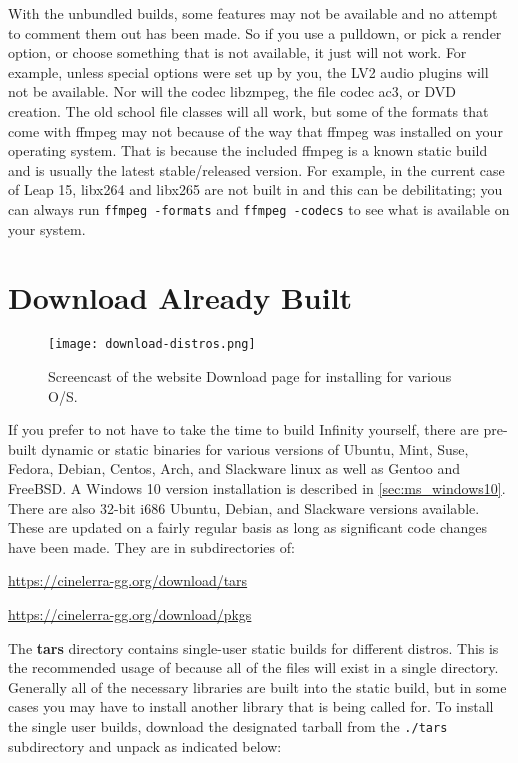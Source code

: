 With the unbundled builds, some features may not be available and
no attempt to comment them out has been made.  So if you use a
pulldown, or pick a render option, or choose something that is not
available, it just will not work.  For example, unless special
options were set up by you, the LV2 audio plugins will not be
available.  Nor will the codec libzmpeg, the file codec ac3, or
DVD creation.  The old school file classes will all work, but some
of the formats that come with ffmpeg may not because of the way
that ffmpeg was installed on your operating system.  That is
because the \CGG{} included ffmpeg is a known static build and is
usually the latest stable/released version.  For example, in the
current case of Leap 15, libx264 and libx265 are not built in and
this can be debilitating; you can always run \texttt{ffmpeg
  -formats} and \texttt{ffmpeg -codecs} to see what is available
on your system.


\section{Download Already Built \CGG{}}%
\label{sec:download_already_built_cinelerra_gg}

\begin{figure}[htpb]
  \centering
  \texttt{[image: download-distros.png]}
  \caption{Screencast of the website Download page for installing \CGG{} for various O/S.}
  \label{fig:download-distros}
\end{figure}

If you prefer to not have to take the time to build \CGG{} Infinity
yourself, there are pre-built dynamic or static binaries for various
versions of Ubuntu, Mint, Suse, Fedora, Debian, Centos, Arch, and
Slackware linux as well as Gentoo and FreeBSD.
%
A Windows 10 version installation is described in
\ref{sec:ms_windows10}.  There are also 32-bit i686 Ubuntu, Debian,
and Slackware versions available.  These are updated on a fairly
regular basis as long as significant code changes have been made.
They are in subdirectories of:

\begin{list}{}{}
\item \href{https://cinelerra-gg.org/download/tars}{https://cinelerra-gg.org/download/tars}
\item \href{https://cinelerra-gg.org/download/pkgs}{https://cinelerra-gg.org/download/pkgs}
\end{list}

The \textbf{tars} directory contains single-user static builds for
different distros.
%
This is the recommended usage of \CGG{} because all of the files
will exist in a single directory.  Generally all of the necessary
libraries are built into the static build, but in some cases you may
have to install another library that is being called for.
%
To install the single user builds, download the designated tarball
from the \texttt{./tars} subdirectory and unpack as indicated below:

